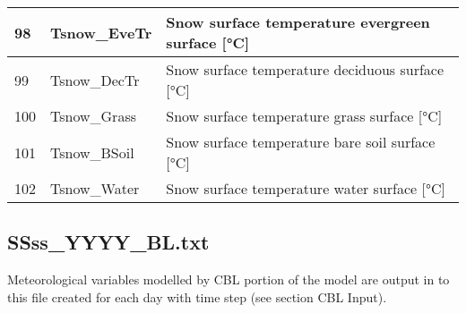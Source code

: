 \documentclass[letterpaper,10pt,english]{sphinxmanual}
\begin{document}
\begin{savenotes}
\begin{longtable}{|l|l|l|}
98
&
Tsnow\_EveTr
&
Snow surface temperature \textendash{} evergreen surface {[}°C{]}
\\
\hline
99
&
Tsnow\_DecTr
&
Snow surface temperature \textendash{} deciduous surface {[}°C{]}
\\
\hline
100
&
Tsnow\_Grass
&
Snow surface temperature \textendash{} grass surface {[}°C{]}
\\
\hline
101
&
Tsnow\_BSoil
&
Snow surface temperature \textendash{} bare soil surface {[}°C{]}
\\
\hline
102
&
Tsnow\_Water
&
Snow surface temperature \textendash{} water surface {[}°C{]}
\\
\hline
\end{longtable}\sphinxatlongtableend\end{savenotes}


\subsection{SSss\_YYYY\_BL.txt}
\label{\detokenize{output_files/output_files:ssss-yyyy-bl-txt}}
Meteorological variables modelled by CBL portion of the model are output
in to this file created for each day with time step (see section CBL
Input).
\end{document}
